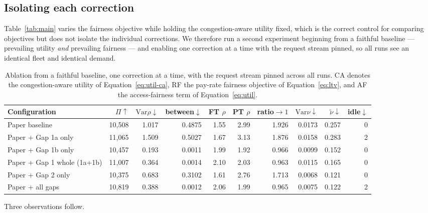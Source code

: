 \documentclass[10pt,twocolumn]{article}
\begin{document}
\subsection{Isolating each correction}
Table~\ref{tab:main} varies the fairness objective while holding the congestion-aware utility fixed, which is the correct control for comparing objectives but does not isolate the individual corrections. We therefore run a second experiment beginning from a faithful baseline --- prevailing utility \emph{and} prevailing fairness --- and enabling one correction at a time with the request stream pinned, so all runs see an identical fleet and identical demand.

\begin{table}[t]
\centering
\caption{Ablation from a faithful baseline, one correction at a time, with the request stream pinned across all runs. CA denotes the congestion-aware utility of Equation~\ref{eq:util-ca}, RF the pay-rate fairness objective of Equation~\ref{eq:ltv}, and AF the access-fairness term of Equation~\ref{eq:util}.}
\label{tab:iso}
\footnotesize
\begin{tabular}{lrrrrrrrrr}
\toprule
Configuration & \(\Pi\uparrow\) & \(\mathrm{Var}\rho\downarrow\) & between\(\downarrow\) & FT \(\rho\) & PT \(\rho\) & ratio\(\to 1\) & \(\mathrm{Var}\nu\downarrow\) & \(\tilde{\nu}\downarrow\) & idle\(\downarrow\) \\
\midrule
Paper baseline & 10,508 & 1.017 & 0.4875 & 1.55 & 2.99 & 1.926 & 0.0173 & 0.257 & 0 \\
Paper + Gap 1a only & 11,065 & 1.509 & 0.5027 & 1.67 & 3.13 & 1.876 & 0.0158 & 0.283 & 2 \\
Paper + Gap 1b only & 10,457 & 0.193 & 0.0011 & 1.99 & 1.92 & 0.966 & 0.0099 & 0.152 & 0 \\
Paper + Gap 1 whole (1a+1b) & 11,007 & 0.364 & 0.0014 & 2.10 & 2.03 & 0.963 & 0.0115 & 0.165 & 0 \\
Paper + Gap 2 only & 10,375 & 0.683 & 0.3102 & 1.61 & 2.76 & 1.713 & 0.0068 & 0.121 & 0 \\
Paper + all gaps & 10,819 & 0.388 & 0.0012 & 2.06 & 1.99 & 0.965 & 0.0075 & 0.122 & 2 \\
\bottomrule
\end{tabular}
\end{table}
Three observations follow.
\end{document}
